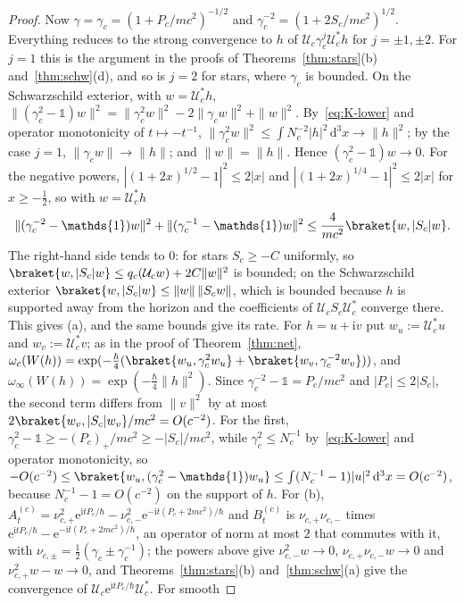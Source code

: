 \documentclass[%
 aip,
 jmp,
 amsmath,amssymb,
 reprint, onecolumn
]{revtex4-1}
\theoremstyle{definition}
\theoremstyle{remark}
\newcommand{\one}{\mathds{1}}
\newcommand{\rmd}{\mathrm{d}}
\newcommand{\rmi}{\mathrm{i}}
\newcommand{\rme}{\mathrm{e}}
\begin{document}
\begin{proof}
Now $\gamma=\gamma_c=(1+P_c/mc^2)^{-1/2}$ and $\gamma_c^{-2}=
(1+2S_c/mc^2)^{1/2}$. Everything reduces to the strong convergence to
$h$ of $\mathcal{U}_c\gamma_c^{j}\mathcal{U}_c^*h$ for $j=\pm1,\pm2$.
For $j=1$ this is the argument in the proofs of
Theorems~\ref{thm:stars}(b) and~\ref{thm:schw}(d), and so is $j=2$ for
stars, where $\gamma_c$ is bounded. On the Schwarzschild exterior, with
$w=\mathcal{U}_c^*h$, $\|(\gamma_c^2-\one)w\|^2=\|\gamma_c^2w\|^2-2\|
\gamma_cw\|^2+\|w\|^2$. By~\eqref{eq:K-lower} and operator monotonicity
of $t\mapsto-t^{-1}$, $\|\gamma_c^2w\|^2\leq\int N_c^{-2}|h|^2\,\rmd^3x
\to\|h\|^2$; by the case $j=1$, $\|\gamma_cw\|\to\|h\|$; and $\|w\|=
\|h\|$. Hence $(\gamma_c^2-\one)w\to0$. For the negative powers, $|(1+2x)^{1/2}-1|^2\leq2|x|$ and $|(1+2x)^{1/4}-1|^2\leq2|x|$ for
$x\geq-\frac12$, so with $w=\mathcal{U}_c^*h$
\[
\|(\gamma_c^{-2}-\one)w\|^2+\|(\gamma_c^{-1}-\one)w\|^2\leq
\frac{4}{mc^2}\braket{w,|S_c|w}.
\]
The right-hand side tends to $0$: for stars $S_c\geq-C$ uniformly, so
$\braket{w,|S_c|w}\leq q_c(\mathcal{U}_cw)+2C\|w\|^2$ is bounded; on the
Schwarzschild exterior $\braket{w,|S_c|w}\leq\|w\|\,\|S_cw\|$, which is
bounded because $h$ is supported away from the horizon and the
coefficients of $\mathcal{U}_cS_c\mathcal{U}_c^*$ converge there. This
gives (a), and the same bounds give its rate. For $h=u+\rmi v$ put
$w_u:=\mathcal{U}_c^*u$ and $w_v:=\mathcal{U}_c^*v$; as in the proof of
Theorem~\ref{thm:net}, $\omega_c(W(h))=\exp(-\frac\hbar4(\braket{w_u,
\gamma_c^2w_u}+\braket{w_v,\gamma_c^{-2}w_v}))$, and $\omega_\infty(W(h))=
\exp(-\frac\hbar4\|h\|^2)$. Since $\gamma_c^{-2}-\one=P_c/mc^2$ and
$|P_c|\leq2|S_c|$, the second term differs from $\|v\|^2$ by at most
$2\braket{w_v,|S_c|w_v}/mc^2=O(c^{-2})$. For the first,
$\gamma_c^2-\one\geq-(P_c)_+/mc^2\geq-|S_c|/mc^2$, while $\gamma_c^2\leq
N_c^{-1}$ by~\eqref{eq:K-lower} and operator monotonicity, so
$-O(c^{-2})\leq\braket{w_u,(\gamma_c^2-\one)w_u}\leq\int(N_c^{-1}-1)|u|^2
\,\rmd^3x=O(c^{-2})$, because $N_c^{-1}-1=O(c^{-2})$ on the support of
$h$. For (b), $A^{(c)}_t=\nu_{c,+}^2\rme^{\rmi tP_c/\hbar}-
\nu_{c,-}^2\rme^{-\rmi t(P_c+2mc^2)/\hbar}$ and $B^{(c)}_t$ is
$\nu_{c,+}\nu_{c,-}$ times $\rme^{\rmi tP_c/\hbar}-\rme^{-\rmi t(P_c+
2mc^2)/\hbar}$, an operator of norm at most $2$ that commutes with it,
with
$\nu_{c,\pm}=\frac12(\gamma_c\pm\gamma_c^{-1})$; the powers above give
$\nu_{c,-}^2w\to0$, $\nu_{c,+}\nu_{c,-}w\to0$ and $\nu_{c,+}^2w-w\to0$,
and
Theorems~\ref{thm:stars}(b) and~\ref{thm:schw}(a) give the convergence
of $\mathcal{U}_c\rme^{\rmi tP_c/\hbar}\mathcal{U}_c^*$. For smooth

\end{proof}
\end{document}
